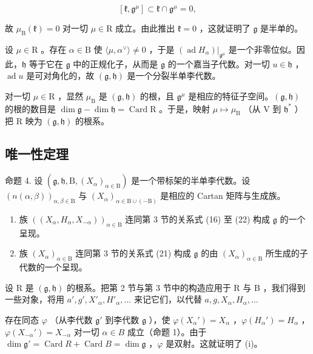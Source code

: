 \[
[ \mathfrak {k}, \mathfrak {g} ^ {\mu} ] \subset \mathfrak {k} \cap \mathfrak {g} ^ {\mu} = 0,
\]

故 \(\mu_{\mathrm{B}}(\mathfrak{k}) = 0\) 对一切 \(\mu \in \mathrm{R}\) 成立。由此推出 \(\mathfrak{k} = 0\) ，这就证明了 \(\mathfrak{g}\) 是半单的。

设 \(\mu \in \mathrm{R}\) 。存在 \(\alpha \in \mathrm{B}\) 使 \(\langle \mu, \alpha^{\vee} \rangle \neq 0\) ，于是 \((\operatorname{ad} H_{\alpha})|_{\mathfrak{g}^{\mu}}\) 是一个非零位似。因此，\(\mathfrak{h}\) 等于它在 \(\mathfrak{g}\) 中的正规化子，从而是 \(\mathfrak{g}\) 的一个嘉当子代数。对一切 \(u \in \mathfrak{h}\) ，\(\operatorname{ad} u\) 是可对角化的，故 \((\mathfrak{g}, \mathfrak{h})\) 是一个分裂半单李代数。

对一切 \(\mu \in \mathrm{R}\) ，显然 \(\mu_{\mathrm{B}}\) 是 \((\mathfrak{g},\mathfrak{h})\) 的根，且 \(\mathfrak{g}^{\mu}\) 是相应的特征子空间。\((\mathfrak{g},\mathfrak{h})\) 的根的数目是 \(\dim \mathfrak{g} - \dim \mathfrak{h} = \operatorname{Card}\mathrm{R}\) 。于是，映射 \(\mu \mapsto \mu_{\mathrm{B}}\) （从 V 到 \(\mathfrak{h}^*\) ）把 R 映为 \((\mathfrak{g},\mathfrak{h})\) 的根系。

\subsection{唯一性定理}

命题 4. 设 \((\mathfrak{g},\mathfrak{h},\mathrm{B},(X_{\alpha})_{\alpha\in\mathrm{B}})\) 是一个带标架的半单李代数。设 \((n(\alpha,\beta))_{\alpha,\beta\in\mathrm{B}}\) 与 \((X_{\alpha})_{\alpha\in\mathrm{B}\cup(-\mathrm{B})}\) 是相应的 Cartan 矩阵与生成族。

\begin{enumerate}
\def\labelenumi{(\roman{enumi})}
\item
  族 \(((X_{\alpha}, H_{\alpha}, X_{-\alpha}))_{\alpha \in \mathrm{B}}\) 连同第 3 节的关系式 (16) 至 (22) 构成 \(\mathfrak{g}\) 的一个呈现。
\item
  族 \((X_{\alpha})_{\alpha \in \mathrm{B}}\) 连同第 3 节的关系式 (21) 构成 \(\mathfrak{g}\) 的由 \((X_{\alpha})_{\alpha \in \mathrm{B}}\) 所生成的子代数的一个呈现。
\end{enumerate}

设 R 是 \((\mathfrak{g},\mathfrak{h})\) 的根系。把第 2 节与第 3 节中的构造应用于 R 与 B ，我们得到一些对象，将用 \(a', g', X'_{\alpha}, H'_{\alpha}, \ldots\) 来记它们，以代替 \(a, g, X_{\alpha}, H_{\alpha}, \ldots\)

存在同态 \(\varphi\) （从李代数 \(\mathfrak{g}'\) 到李代数 \(\mathfrak{g}\) ），使 \(\varphi(X_{\alpha}') = X_{\alpha}\) ，\(\varphi(H_{\alpha}') = H_{\alpha}\) ，\(\varphi(X_{-\alpha}') = X_{-\alpha}\) 对一切 \(\alpha \in B\) 成立（命题 1）。由于 \(\dim \mathfrak{g}' = \operatorname{Card} R + \operatorname{Card} B = \dim \mathfrak{g}\) ，\(\varphi\) 是双射。这就证明了 (i)。

